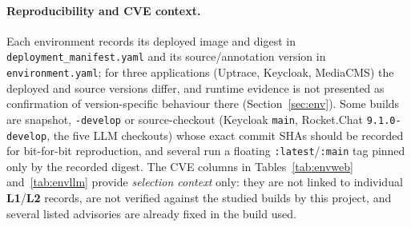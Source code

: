 \documentclass[11pt,a4paper]{article}
\newcommand{\cd}[1]{\lstinline[basicstyle=\ttfamily\small]|#1|}
\renewcommand{\L}[1]{\textbf{L#1}}
\begin{document}
\paragraph{Reproducibility and CVE context.} Each environment records its deployed image and
digest in \cd{deployment_manifest.yaml} and its source/annotation version in
\cd{environment.yaml}; for three applications (Uptrace, Keycloak, MediaCMS) the deployed and
source versions differ, and runtime evidence is not presented as confirmation of
version-specific behaviour there (Section~\ref{sec:env}). Some builds are snapshot,
\texttt{-develop} or source-checkout (Keycloak \texttt{main}, Rocket.Chat
\texttt{9.1.0-develop}, the five LLM checkouts) whose exact commit SHAs should be recorded for
bit-for-bit reproduction, and several run a floating \texttt{:latest}/\texttt{:main} tag
pinned only by the recorded digest. The CVE columns in Tables~\ref{tab:envweb}
and~\ref{tab:envllm} provide \emph{selection context} only: they are not linked to individual
\L1/\L2 records, are not verified against the studied builds by this project, and several
listed advisories are already fixed in the build used.

\end{document}
